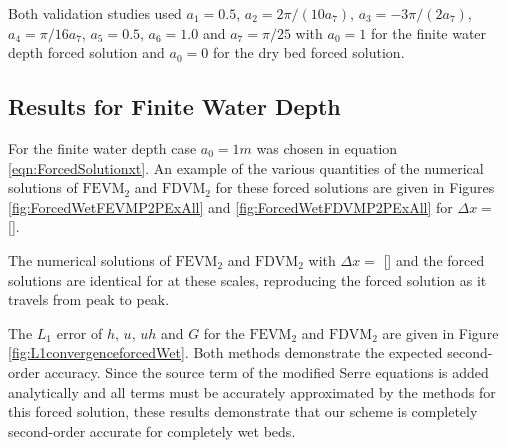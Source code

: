Both validation studies used $a_1 = 0.5$, $a_2 = 2 \pi / \left(10 a_7\right)$, $a_3 = - 3\pi/ \left(2 a_7\right)$, $a_4 = \pi / 16 a_7$, $a_5 = 0.5$, $a_6 = 1.0$ and $a_7 = \pi / 25$ with $a_0= 1$ for the finite water depth forced solution and $a_0=0$ for the dry bed forced solution. 


\subsection{Results for Finite Water Depth} 
For the finite water depth case $a_0 = 1m$ was chosen in equation \eqref{eqn:ForcedSolutionxt}. An example of the various quantities of the numerical solutions of  $\text{FEVM}_2$ and $\text{FDVM}_2$ for these forced solutions are given in Figures \ref{fig:ForcedWetFEVMP2PExAll} and \ref{fig:ForcedWetFDVMP2PExAll} for $\Delta x = $ [].

The numerical solutions of $\text{FEVM}_2$ and $\text{FDVM}_2$ with $\Delta x = $ [] and the forced solutions are identical for at these scales, reproducing the forced solution as it travels from peak to peak.

The $L_1$ error of $h$, $u$, $uh$ and $G$ for the $\text{FEVM}_2$ and $\text{FDVM}_2$ are given in Figure \ref{fig:L1convergenceforcedWet}. Both methods demonstrate the expected second-order accuracy. Since the source term of the modified Serre equations is added analytically and all terms must be accurately approximated by the methods for this forced solution, these results demonstrate that our scheme is completely second-order accurate for completely wet beds.

